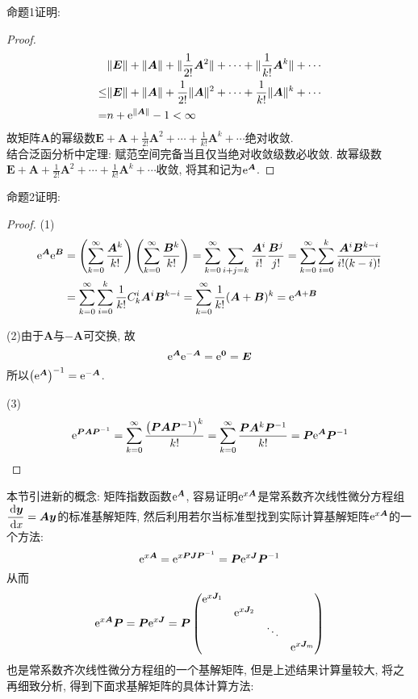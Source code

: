 命题1证明:

\begin{proof}
\[\begin{split}
&\|\bm{E}\|+\|\bm{A}\|+\|\frac{1}{2!}\bm{A}^2\|+\cdots+\|\frac{1}{k!}\bm{A}^k\|+\cdots\\
\leq&\|\bm{E}\|+\|\bm{A}\|+\frac{1}{2!}\|\bm{A}\|^2+\cdots+\frac{1}{k!}\|\bm{A}\|^k+\cdots\\
=&n+\mathrm{e}^{\|\bm{A}\|}-1<\infty
\end{split}\]
故矩阵$\bm{A}$的幂级数$\displaystyle\bm{E}+\bm{A}+\frac{1}{2!}\bm{A}^2+\cdots+\frac{1}{k!}\bm{A}^k+\cdots$绝对收敛.\\
结合泛函分析中定理: 赋范空间完备当且仅当绝对收敛级数必收敛. 
故幂级数$\displaystyle\bm{E}+\bm{A}+\frac{1}{2!}\bm{A}^2+\cdots+\frac{1}{k!}\bm{A}^k+\cdots$收敛, 将其和记为$\mathrm{e}^{\bm{A}}$.
\end{proof}

命题2证明:

\begin{proof}
(1)\[\begin{split}
\mathrm{e}^{\bm{A}}\mathrm{e}^{\bm{B}}&=\left(\sum_{k=0}^{\infty}\frac{\bm{A}^k}{k!}\right)\left(\sum_{k=0}^{\infty}\frac{\bm{B}^k}{k!}\right)=\sum_{k=0}^{\infty}\sum_{i+j=k}\frac{\bm{A}^i}{i!}\frac{\bm{B}^j}{j!}=\sum_{k=0}^{\infty}\sum_{i=0}^k\frac{\bm{A}^i\bm{B}^{k-i}}{i!(k-i)!}\\
&=\sum_{k=0}^{\infty}\sum_{i=0}^k\frac{1}{k!}C_k^i\bm{A}^i\bm{B}^{k-i}=\sum_{k=0}^{\infty}\frac{1}{k!}(\bm{A}+\bm{B})^k=\mathrm{e}^{\bm{A}+\bm{B}}
\end{split}\]

(2)由于$\bm{A}$与$-\bm{A}$可交换, 故
\[\mathrm{e}^{\bm{A}}\mathrm{e}^{-\bm{A}}=\mathrm{e}^{\bm{0}}=\bm{E}\]
所以$\left(\mathrm{e}^{\bm{A}}\right)^{-1}=\mathrm{e}^{-\bm{A}}$.

(3)\[\mathrm{e}^{\bm{P}\bm{A}\bm{P}^{-1}}=\sum_{k=0}^{\infty}\frac{\left(\bm{P}\bm{A}\bm{P}^{-1}\right)^k}{k!}=\sum_{k=0}^{\infty}\frac{\bm{P}\bm{A}^k\bm{P}^{-1}}{k!}=\bm{P}\mathrm{e}^{\bm{A}}\bm{P}^{-1}\qedhere\]
\end{proof}


本节引进新的概念: 矩阵指数函数$\mathrm{e}^{\bm{A}}$, 
容易证明$\mathrm{e}^{x\bm{A}}$是常系数齐次线性微分方程组
$\displaystyle\frac{\,\mathrm{d}\bm{y}}{\,\mathrm{d} x}=\bm{A}\bm{y}$的标准基解矩阵, 
然后利用若尔当标准型找到实际计算基解矩阵$\mathrm{e}^{x\bm{A}}$的一个方法:
\[\mathrm{e}^{x\bm{A}}=\mathrm{e}^{x\bm{P}\bm{J}\bm{P}^{-1}}=\bm{P}\mathrm{e}^{x\bm{J}}\bm{P}^{-1}\]
从而\[\mathrm{e}^{x\bm{A}}\bm{P}=\bm{P}\mathrm{e}^{x\bm{J}}=\bm{P}\begin{pmatrix}
\mathrm{e}^{x\bm{J}_1}&&&\\&\mathrm{e}^{x\bm{J}_2}&&\\&&\ddots&\\&&&\mathrm{e}^{x\bm{J}_m}
\end{pmatrix}\]
也是常系数齐次线性微分方程组的一个基解矩阵, 但是上述结果计算量较大, 将之再细致分析, 得到下面求基解矩阵的具体计算方法:

